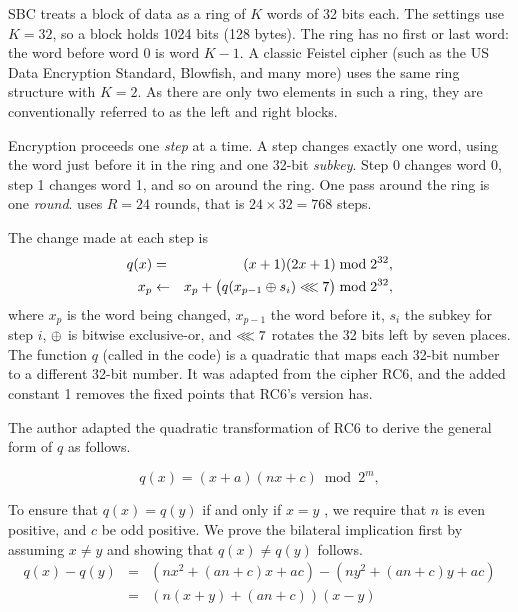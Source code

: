 SBC treats a block of data as a ring of $K$ words of 32 bits each. The
 settings use $K = 32$, so a block holds 1024 bits (128 bytes).
The ring has no first or last word: the word before word 0 is word $K-1$.
A classic Feistel cipher (such as the US Data Encryption Standard, Blowfish, and many more)
uses the same ring structure with $K=2$. As there are only two elements in such a  ring,
they are conventionally referred to as the left and right blocks.

Encryption proceeds one \emph{step} at a time. A step changes exactly one word,
using the word just before it in the ring and one 32-bit \emph{subkey}. Step 0
changes word 0, step 1 changes word 1, and so on around the ring. One pass
around the ring is one \emph{round}.  uses $R = 24$ rounds, that
is $24 \times 32 = 768$ steps.

The change made at each step is
\begin{eqnarray}
q(x) &=& (x+1)(2x+1) \bmod 2^{32}, \label{eq:step_A} \\
x_p &\leftarrow& x_p + \bigl( q(x_{p-1} \oplus s_i) \lll 7 \bigr) \bmod 2^{32},
\label{eq:step_B}
\end{eqnarray}
where $x_p$ is the word being changed, $x_{p-1}$ the word before it, $s_i$ the
subkey for step $i$, $\oplus$ is bitwise exclusive-or, and $\lll 7$ rotates the
32 bits left by seven places. The function $q$ (called  in the
code) is a quadratic that maps each 32-bit number to a different 32-bit number.
It was adapted from the cipher RC6, and the added constant 1 removes the fixed
points that RC6's version has.

The author adapted the quadratic transformation of RC6 to 
derive the general form of $q$ as follows.

\begin{equation}
q(x) = (x+a)(nx+c) \bmod 2^{m},
\end{equation}

To ensure that  $q(x) = q(y)$ if and only if $x = y$ , we require
that 
$n$ is even positive, 
and
$c$ be odd positive.  We prove the bilateral implication first by assuming $x \neq y$
and showing that $q(x) \neq q(y)$ follows.
\begin{eqnarray}
q(x) - q(y) &=& \left( nx^2 +(an+ c)x + ac \right) - \left( ny^2 + (an+c)y  + ac \right) \label{eq:qinj_A} \\
 &=& \left( n (x+y) + (an+c) \right)  (x-y) \label{eq:qinj_B}
\end{eqnarray}

